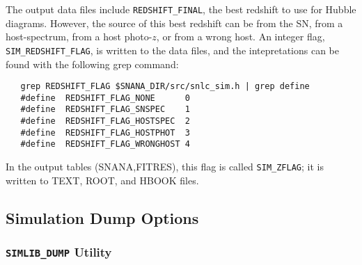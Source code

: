 \documentclass[12pt]{article}
\begin{document}
The output data files include {\tt REDSHIFT\_FINAL},
the best redshift to use for Hubble diagrams.
However, the source of this best redshift can be
from the SN, from a host-spectrum, from a host photo-$z$,
or from a wrong host. An integer flag, {\tt SIM\_REDSHIFT\_FLAG},
is written to the data files, and the intepretations can be
found with the following grep command:

\begin{verbatim}
   grep REDSHIFT_FLAG $SNANA_DIR/src/snlc_sim.h | grep define
   #define  REDSHIFT_FLAG_NONE      0
   #define  REDSHIFT_FLAG_SNSPEC    1 
   #define  REDSHIFT_FLAG_HOSTSPEC  2
   #define  REDSHIFT_FLAG_HOSTPHOT  3
   #define  REDSHIFT_FLAG_WRONGHOST 4
\end{verbatim}

In the output tables (SNANA,FITRES), this flag is called {\tt SIM\_ZFLAG};
it is written to TEXT, ROOT, and HBOOK files.


  \clearpage
   \subsection{Simulation Dump Options}
   \label{subsec:dump_options}


   \subsubsection{{\tt SIMLIB\_DUMP} Utility }
   \label{sssec:simlib_dump}
\end{document}
